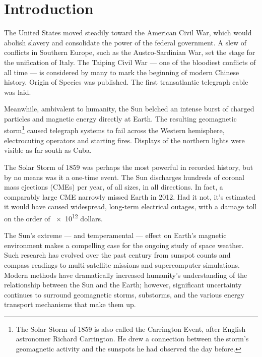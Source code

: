 


\chapter{Introduction}
  \label{ch_intro}


 The United States moved steadily toward the American Civil War, which would abolish slavery and consolidate the power of the federal government. A slew of conflicts in Southern Europe, such as the Austro-Sardinian War, set the stage for the unification of Italy. The Taiping Civil War --- one of the bloodiest conflicts of all time --- is considered by many to mark the beginning of modern Chinese history. Origin of Species was published. The first transatlantic telegraph cable was laid.

Meanwhile, ambivalent to humanity, the Sun belched an intense burst of charged particles and magnetic energy directly at Earth. The resulting geomagnetic storm\footnote{The Solar Storm of 1859 is also called the Carrington Event, after English astronomer Richard Carrington. He drew a connection between the storm's geomagnetic activity and the sunspots he had observed the day before.} caused telegraph systems to fail across the Western hemisphere, electrocuting operators and starting fires\cite{green_2006,tsurutani_2003}. Displays of the northern lights were visible as far south as Cuba. 

The Solar Storm of 1859 was perhaps the most powerful in recorded history, but by no means was it a one-time event. The Sun discharges hundreds of coronal mass ejections (CMEs) per year, of all sizes, in all directions. In fact, a comparably large CME narrowly missed Earth in 2012\cite{nasa_2012}. Had it not, it's estimated it would have caused widespread, long-term electrical outages, with a damage toll on the order of \num{e12} dollars\cite{lloyds_2013}. 

The Sun's extreme --- and temperamental --- effect on Earth's magnetic environment makes a compelling case for the ongoing study of space weather. Such research has evolved over the past century from sunspot counts and compass readings to multi-satellite missions and supercomputer simulations. Modern methods have dramatically increased humanity's understanding of the relationship between the Sun and the Earth; however, significant uncertainty continues to surround geomagnetic storms, substorms, and the various energy transport mechanisms that make them up. 

